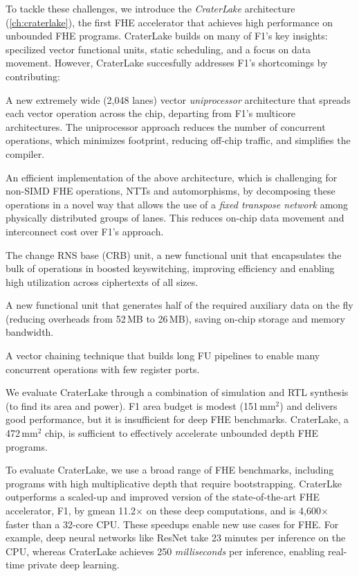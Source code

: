 To tackle these challenges, we introduce the \emph{CraterLake} architecture
(\autoref{ch:craterlake}), the first FHE accelerator
that achieves high performance on unbounded FHE programs. CraterLake builds on
many of F1's key insights: specilized vector functional units, static
scheduling, and a focus on data movement. However, CraterLake succesfully
addresses F1's shortcomings by contributing:
\begin{compactitem}
\item A new extremely wide (2,048 lanes) vector \emph{uniprocessor}
    architecture that spreads each vector operation across the chip, departing
    from F1's multicore architectures. The uniprocessor approach reduces the
    number of concurrent operations, which minimizes footprint, reducing
    off-chip traffic, and simplifies the compiler.
\item An efficient implementation of the above architecture, which is
    challenging for non-SIMD FHE operations, NTTs and automorphisms, by
    decomposing these operations in a novel way that allows the use of a
    \emph{fixed transpose network} among physically distributed groups of
    lanes. This reduces on-chip data movement and interconnect cost over F1's
    approach.
\item The change RNS base (CRB) unit, a new functional unit that encapsulates
    the bulk of operations in boosted keyswitching, improving efficiency and
    enabling high utilization across ciphertexts of all sizes.
\item A new functional unit that generates half of the required auxiliary data
    on the fly (reducing overheads from 52\,MB to 26\,MB), saving on-chip
    storage and memory bandwidth.
\item A vector chaining technique that builds long FU pipelines to enable many
    concurrent operations with few register ports.
\end{compactitem}

We evaluate CraterLake through a combination of simulation and RTL synthesis
(to find its area and power).
F1 area budget is modest (151\,mm$^2$) and delivers good performance, but it is
insufficient for deep FHE benchmarks. CraterLake, a 472\,mm$^2$ chip, is
sufficient to effectively accelerate unbounded depth FHE programs.

To evaluate CraterLake, we use a broad range of FHE benchmarks, including
programs with high multiplicative depth that require bootstrapping. CraterLke
outperforms a scaled-up and improved version of the state-of-the-art FHE
accelerator, F1, by gmean 11.2$\times$ on these deep computations, and is
4,600$\times$ faster than a 32-core CPU. These speedups enable new use cases
for FHE. For example, deep neural networks like ResNet take 23 minutes per
inference on the CPU, whereas CraterLake achieves 250 \emph{milliseconds} per
inference, enabling real-time private deep learning.
